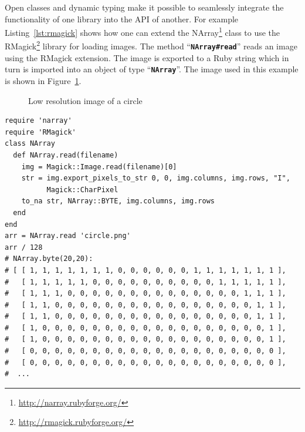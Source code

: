 \documentclass[12pt,a4paper,oneside,openright]{book}
\newcommand{\Eg}{For ex\-am\-ple }
\newcommand{\fig}[1]{Figure~\ref{fig:#1}}
\newcommand{\lst}[1]{Listing~\ref{lst:#1}}
\newcommand{\code}[1]{``\texttt{\textbf{\textcolor{codegray}{\small{#1}}}}''}
\newcommand{\rubyout}{Comment lines (preceded with ``\#'') show the output of the program}
\begin{document}
\begin{CJK}{UTF8}{}
Open classes and dynamic typing make it possible to seamlessly integrate the functionality of one library into the \ac{API} of another. \Eg \lst{rmagick} shows how one can extend the NArray\footnote{\url{http://narray.rubyforge.org/}} class to use the RMagick\footnote{\url{http://rmagick.rubyforge.org/}} library for loading images. The method \code{NArray\#read} reads an image using the RMagick extension. The image is exported to a Ruby string which in turn is imported into an object of type \code{NArray}. The image used in this example is shown in \fig{circle}.
\begin{figure}[htbp]
  \begin{center}
    \caption{Low resolution image of a circle\label{fig:circle}}
  \end{center}
\end{figure}
\lstset{language=Ruby,frame=single,numbers=none}
\begin{lstlisting}[float=htbp,caption={Integrating RMagick and NArray in Ruby. \rubyout},label=lst:rmagick]
require 'narray'
require 'RMagick'
class NArray
  def NArray.read(filename)
    img = Magick::Image.read(filename)[0]
    str = img.export_pixels_to_str 0, 0, img.columns, img.rows, "I",
          Magick::CharPixel
    to_na str, NArray::BYTE, img.columns, img.rows
  end
end
arr = NArray.read 'circle.png'
arr / 128
# NArray.byte(20,20):
# [ [ 1, 1, 1, 1, 1, 1, 1, 0, 0, 0, 0, 0, 0, 1, 1, 1, 1, 1, 1, 1 ],
#   [ 1, 1, 1, 1, 1, 0, 0, 0, 0, 0, 0, 0, 0, 0, 0, 1, 1, 1, 1, 1 ],
#   [ 1, 1, 1, 0, 0, 0, 0, 0, 0, 0, 0, 0, 0, 0, 0, 0, 0, 1, 1, 1 ],
#   [ 1, 1, 0, 0, 0, 0, 0, 0, 0, 0, 0, 0, 0, 0, 0, 0, 0, 0, 1, 1 ],
#   [ 1, 1, 0, 0, 0, 0, 0, 0, 0, 0, 0, 0, 0, 0, 0, 0, 0, 0, 1, 1 ],
#   [ 1, 0, 0, 0, 0, 0, 0, 0, 0, 0, 0, 0, 0, 0, 0, 0, 0, 0, 0, 1 ],
#   [ 1, 0, 0, 0, 0, 0, 0, 0, 0, 0, 0, 0, 0, 0, 0, 0, 0, 0, 0, 1 ],
#   [ 0, 0, 0, 0, 0, 0, 0, 0, 0, 0, 0, 0, 0, 0, 0, 0, 0, 0, 0, 0 ],
#   [ 0, 0, 0, 0, 0, 0, 0, 0, 0, 0, 0, 0, 0, 0, 0, 0, 0, 0, 0, 0 ],
#  ...
\end{lstlisting}


\end{CJK}
\end{document}
